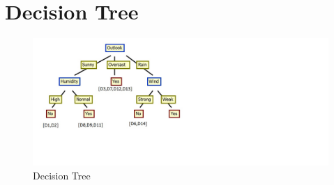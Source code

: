 \documentclass{report}
\begin{document}
\section{Decision Tree}
\begin{figure}[h]
\centering

\includegraphics[bb=0 0 1360 588,scale=0.5,keepaspectratio=true]{DecisionTree.jpg}
\caption{Decision Tree}
\end{figure}





\end{document}
